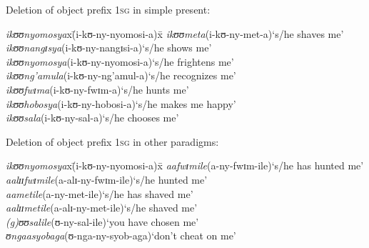 \begin{exe}
	\ex\label{exOM1SGDelition}\begin{xlist}
		\ex Deletion of object prefix \textsc{1sg} in simple present:
		\begin{tabbing}
			\textit{ikʊʊnyomosya}x\=(\degree i-kʊ-ny-nyomosi-a)x\= \kill
			\textit{ikʊʊmeta}\>(\degree i-kʊ-ny-met-a)\>`s/he shaves me'
			\\\textit{ikʊʊnangɪsya}\>(\degree i-kʊ-ny-nangɪsi-a)\>`s/he shows me'
			\\\textit{ikʊʊnyomosya}\>(\degree i-kʊ-ny-nyomosi-a)\>`s/he frightens me'
			\\\textit{ikʊʊng'amula}\>(\degree i-kʊ-ny-ng'amul-a)\>`s/he recognizes me'
			\\\textit{ikʊʊfwɪma}\>(\degree i-kʊ-ny-fwɪm-a)\>`s/he hunts me'
			\\\textit{ikʊʊhobosya}\>(\degree i-kʊ-ny-hobosi-a)\>`s/he makes me happy'
			\\\textit{ikʊʊsala}\>(\degree i-kʊ-ny-sal-a)\>`s/he chooses me'
		\end{tabbing}
		\ex Deletion of object prefix \textsc{1sg} in other paradigms:
		\begin{tabbing}
			\textit{ikʊʊnyomosya}x\=(\degree i-kʊ-ny-nyomosi-a)x\= \kill
			\textit{aafwɪmile}\>(\degree a-ny-fwɪm-ile)\>`s/he has hunted me'
			\\\textit{aalɪɪfwɪmile}\>(\degree a-alɪ-ny-fwɪm-ile)\>`s/he hunted me'
			\\\textit{aametile}\>(\degree a-ny-met-ile)\>`s/he has shaved me'
			\\\textit{aalɪɪmetile}\>(\degree a-alɪ-ny-met-ile)\>`s/he shaved me'
			\\\textit{(g)ʊʊsalile}\>(\degree ʊ-ny-sal-ile)\>`you have chosen me'
			\\\textit{ʊngaasyobaga}\>(\degree ʊ-nga-ny-syob-aga)\>`don't cheat on me'
		\end{tabbing}
	\end{xlist}
\end{exe}
